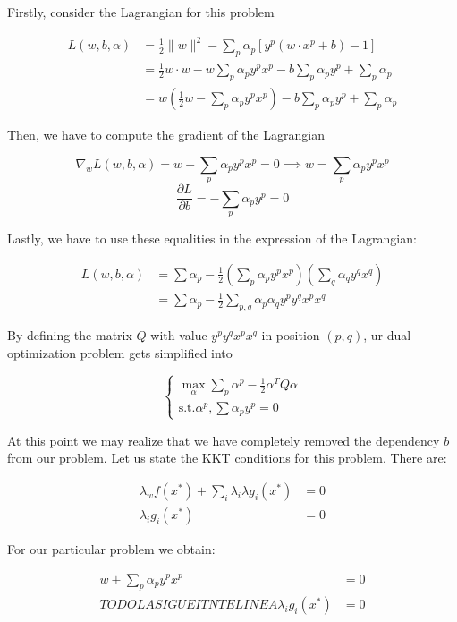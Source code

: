 \documentclass[11pt,table]{article}
\newcommand\norm[1]{\lVert#1\rVert}
\begin{document}
Firstly, consider the Lagrangian for this problem

\begin{align*}
  L(w,b,\alpha) & = \frac{1}{2} \norm{w}^2 - \sum_p \alpha_p \left[ y^p \left(w \cdot x^p +b\right) -1 \right]       \\
                & = \frac{1}{2} w \cdot w - w \sum_p \alpha_p y^p  x^p - b \sum_p \alpha_p y^p + \sum_p \alpha_p     \\
                & = w \left(\frac{1}{2}w -\sum_p \alpha_p y^p  x^p \right) - b \sum_p \alpha_p y^p + \sum_p \alpha_p
\end{align*}

Then, we have to compute the gradient of the Lagrangian

\[
  \nabla_w L(w,b,\alpha) = w - \sum_p \alpha_p y^p x^p = 0 \implies w = \sum_p \alpha_p y^p x^p
\]
\[
  \frac{\partial L}{\partial b} = - \sum_p \alpha_p y^p = 0
\]

Lastly, we have to use these equalities in the expression of the Lagrangian:

\begin{align*}
  L(w,b,\alpha) & = \sum \alpha_p - \frac{1}{2}\left(\sum_p \alpha_p y^p x^p\right)\left(\sum_q \alpha_q y^q x^q\right) \\
                & = \sum \alpha_p - \frac{1}{2} \sum_{p,q} \alpha_p \alpha_q y^p y^q x^p x^q
\end{align*}

By defining the matrix \(Q\) with value \(y^p y^q x^p x^q\) in position \((p,q)\), ur dual optimization problem gets simplified into

\[
  \begin{cases}
    \max_{\alpha} \sum_p \alpha^p - \frac{1}{2} \alpha^T Q \alpha \\
    \text{s.t.} \alpha^p, \sum \alpha_p y^p = 0
  \end{cases}
\]

At this point we may realize that we have completely removed the dependency \(b\) from our problem. Let us state the KKT conditions for this problem. There are:

\begin{align*}
  \lambda_w f(x^*) + \sum_i \lambda_i \lambda g_i (x^*) & = 0 \\
  \lambda_i g_i(x^*)                                    & = 0
\end{align*}

For our particular problem we obtain:

\begin{align*}
  w + \sum_p \alpha_p y^p x^p & = 0 \\ TODO LA SIGUEITNTE LINEA
  \lambda_i g_i(x^*)          & = 0
\end{align*}
\end{document}
